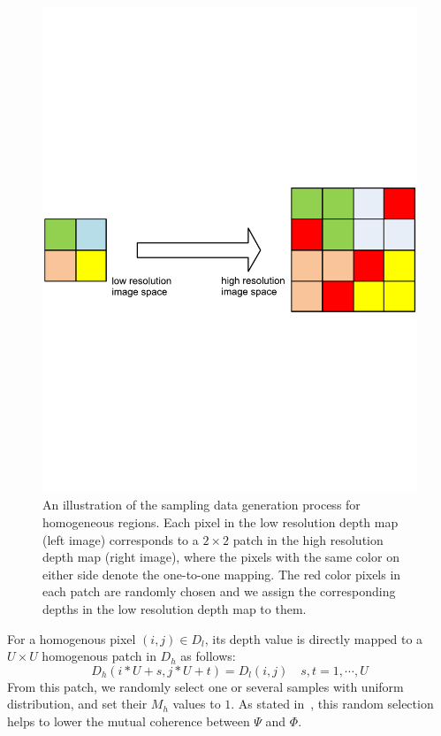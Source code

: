 \documentclass[preprint,10pt,5p,times,twocolumn]{elsarticle}
\begin{document}
\begin{figure}[t]
\centering
\includegraphics[width=\linewidth]{fig_seed_2.pdf}
\caption{An illustration of the sampling data generation process for homogeneous regions. Each pixel in the low resolution depth map (left image) corresponds to a $2 \times 2$ patch in the high resolution depth map (right image), where the pixels with the same color on either side denote the one-to-one mapping. The red color pixels in each patch are randomly chosen and we assign the corresponding depths in the low resolution depth map to them.}
\label{fig:homo_sampling_illustraion}
\end{figure}

For a homogenous pixel $(i,j)\in D_{l}$, its depth value is directly mapped to a $U\times U$ homogenous patch in $D_{h}$ as follows:
\begin{equation}
\label{eq:homogenouse}
D_{h}(i*U+s,j*U+t)=D_{l}(i,j) \quad s,t=1,\cdots,U
\end{equation}
%
From this patch, we randomly select one or several samples with uniform distribution, and set their $M_{h}$ values to $1$. As stated in~\cite{DH01}, this random selection helps to lower the mutual coherence between $\Psi$ and $\Phi$. 
\end{document}
